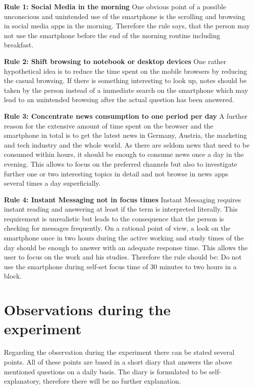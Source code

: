 \textbf{Rule 1: Social Media in the morning}
One obvious point of a possible unconscious and unintended use of the smartphone is the scrolling and browsing in social media apps in the morning. Therefore the rule says, that the person may not use the smartphone before the end of the morning routine including breakfast. \newline

\textbf{Rule 2: Shift browsing to notebook or desktop devices}
One rather hypothetical idea is to reduce the time spent on the mobile browsers by reducing the casual browsing. If there is something interesting to look up, notes should be taken by the person instead of a immediate search on the smartphone which may lead to an unintended browsing after the actual question has been answered. \newline

\textbf{Rule 3: Concentrate news consumption to one period per day}
A further reason for the extensive amount of time spent on the browser and the smartphone in total is to get the latest news in Germany, Austria, the marketing and tech industry and the whole world. As there are seldom news that need to be consumed within hours, it should be enough to consume news once a day in the evening. This allows to focus on the preferred channels but also to investigate further one or two interesting topics in detail and not browse in news apps several times a day superficially. \newline

\textbf{Rule 4: Instant Messaging not in focus times}
Instant Messaging requires instant reading and answering at least if the term is interpreted literally. This requirement is unrealistic but leads to the consequence that the person is checking for messages frequently. On a rational point of view, a look on the smartphone once in two hours during the active working and study times of the day should be enough to answer with an adequate response time. This allows the user to focus on the work and his studies. Therefore the rule should be: Do not use the smartphone during self-set focus time of 30 minutes to two hours in a block. \newline

\section*{Observations during the experiment}
Regarding the observation during the experiment there can be stated several points. All of these points are based in a short diary that answers the above mentioned questions on a daily basis. The diary is formulated to be self-explanatory, therefore there will be no further explanation.

